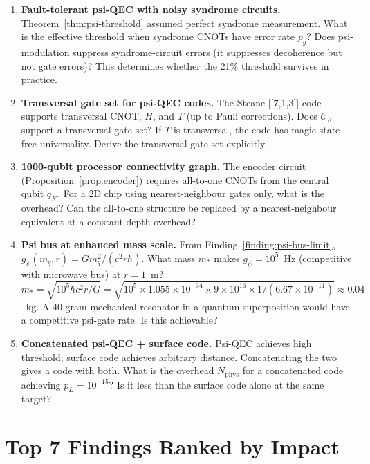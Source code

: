 \documentclass[11pt]{article}
\theoremstyle{definition}
\theoremstyle{remark}
\begin{document}
\begin{enumerate}

\item \textbf{Fault-tolerant psi-QEC with noisy syndrome circuits.}
  Theorem~\ref{thm:psi-threshold} assumed perfect syndrome measurement.
  What is the effective threshold when syndrome CNOTs have error rate $p_g$?
  Does psi-modulation suppress syndrome-circuit errors (it suppresses
  decoherence but not gate errors)?  This determines whether the 21\%
  threshold survives in practice.

\item \textbf{Transversal gate set for psi-QEC codes.}
  The Steane [[7,1,3]] code supports transversal CNOT, $H$, and $T$ (up to
  Pauli corrections).  Does $\mathcal{C}_K$ support a transversal gate set?
  If $T$ is transversal, the code has magic-state-free universality.  Derive
  the transversal gate set explicitly.

\item \textbf{1000-qubit processor connectivity graph.}
  The encoder circuit (Proposition~\ref{prop:encoder}) requires all-to-one
  CNOTs from the central qubit $q_K$.  For a 2D chip using nearest-neighbour
  gates only, what is the overhead?  Can the all-to-one structure be replaced
  by a nearest-neighbour equivalent at a constant depth overhead?

\item \textbf{Psi bus at enhanced mass scale.}
  From Finding~\ref{finding:psi-bus-limit}, $g_\psi(m_q, r) = Gm_q^2/(c^2 r\hbar)$.
  What mass $m_*$ makes $g_\psi = 10^5$~Hz (competitive with microwave bus)
  at $r = 1$~m?
  $m_* = \sqrt{10^5\hbar c^2 r / G} = \sqrt{10^5\times1.055\times10^{-34}
  \times9\times10^{16}\times1/(6.67\times10^{-11})} \approx 0.04$~kg.
  A 40-gram mechanical resonator in a quantum superposition would have a
  competitive psi-gate rate.  Is this achievable?

\item \textbf{Concatenated psi-QEC + surface code.}
  Psi-QEC achieves high threshold; surface code achieves arbitrary distance.
  Concatenating the two gives a code with both.  What is the overhead
  $N_{\mathrm{phys}}$ for a concatenated code achieving $p_L = 10^{-15}$?
  Is it less than the surface code alone at the same target?

\end{enumerate}

\section{Top 7 Findings Ranked by Impact}
\label{sec:top7}
\end{document}
